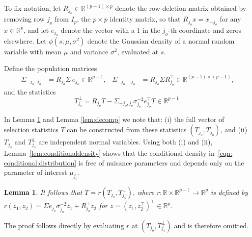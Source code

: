 \documentclass[12pt]{article}
\newtheorem{lemma}[theorem]{Lemma}
\newcommand{\real}{\mathbb{R}}
\begin{document}
To fix notation, let $R_{j_o} \in \real^{(p-1) \times p}$ denote the row-deletion matrix obtained by removing row $j_o$ from $I_p$, the $p\times p$ identity matrix, so that $R_{j_o} x = x_{-j_o}$ for any $x \in \real^p$, and 
let $e_{j_o}$ denote the vector with a $1$ in the $j_o$-th coordinate and zeros elsewhere.
Let $\phi(s; \mu, \sigma^2)$ denote the Gaussian density of a normal random variable with mean $\mu$ and variance $\sigma^2$, evaluated at $s$.

Define the population matrices
\begin{align*}
  \Sigma_{-j_o,\,j_o}
  &= R_{j_o} \Sigma\, e_{j_o}
   \in \real^{p-1},
  &
  \Sigma_{-j_o,-j_o}
  &= R_{j_o} \Sigma R_{j_o}^\top
   \in \real^{(p-1) \times (p-1)},
\end{align*}
and the statistics
\begin{equation}
  \label{eq:Tperp}
  T_{j_o}^\perp= R_{j_o} T- \Sigma_{-j_o,j_o} \sigma_{j_o}^{-2} e_{j_o}^\top T \in \real^{p-1}.
\end{equation}

In Lemma \ref{lem:reconstruction} and Lemma \ref{lem:decomp} we note that: (i) the full vector of selection statistics $T$ can be constructed from these statistics $(T_{j_o}, T_{j_o}^\perp)$, and (ii) $T_{j_o}$ and $T_{j_o}^\perp$ are independent normal variables. 
Using both (i) and (ii), Lemma~\ref{lem:conditionaldensity} shows that the conditional density in~\eqref{eqn: conditional:distribution} is free of nuisance parameters and depends only on the parameter of interest $\mu_{j_o}$.

\begin{lemma}
\label{lem:reconstruction}
It follows that $T=r(T_{j_o},T_{j_o}^{\perp})$, where
$r:\real \times \real^{p-1}\to\mathbb{R}^p$ is defined by
$r(z_1,z_2)=\Sigma e_{j_o}\sigma_{j_o}^{-2}z_1+ R_{j_o}^\top z_2$
for $z=(z_1,z_2^\top)^\top\in\mathbb{R}^p$.
\end{lemma}

The proof follows directly by evaluating $r$ at $(T_{j_o},T_{j_o}^{\perp})$ and is therefore omitted.
\end{document}
